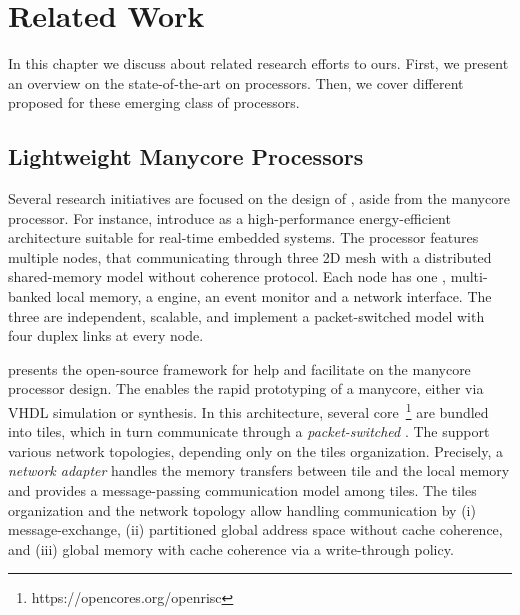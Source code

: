 \chapter{Related Work}
\label{ch.related-work}

In this chapter we discuss about related research efforts to ours.
First, we present an overview on the state-of-the-art on \lightweight
\manycore processors. Then, we cover different \oss proposed for these
emerging class of processors.


\section{Lightweight Manycore Processors}
\label{sec.works.manycores}

	Several research initiatives are focused on the design of
	\lightweight \manycores, aside from the \mppa \lightweight manycore
	processor.  For instance,  introduce
	\epiphany as a high-performance energy-efficient \manycore
	architecture suitable for real-time embedded systems.  The
	processor features multiple nodes, that communicating through three 2D mesh
	\nocs with a distributed shared-memory model without coherence
	protocol.  Each node has one \risc \cpu, multi-banked local memory,
	a \dma engine, an event monitor and a network interface.  The three
	\nocs are independent, scalable, and implement a packet-switched
	model with four duplex links at every node.

	 presents the open-source \optimsoc framework
	for help and facilitate on the manycore processor design. The \optimsoc
	enables the rapid prototyping of a manycore, either via VHDL
	simulation or \fpga synthesis.
	In this architecture, several \openrisc
	core~\footnote{https://opencores.org/openrisc} are bundled into
	tiles, which in turn communicate through a \textit{packet-switched \noc}.
	The \noc support various network topologies, depending only on the tiles organization.
	Precisely, a \textit{network adapter} handles the memory transfers between
	tile and the local memory and provides a message-passing communication
	model among tiles.
	The tiles organization and the network topology allow handling
	communication by (i) message-exchange, (ii) partitioned global
	address space without cache coherence, and (iii) global memory
	with cache coherence via a write-through policy.

